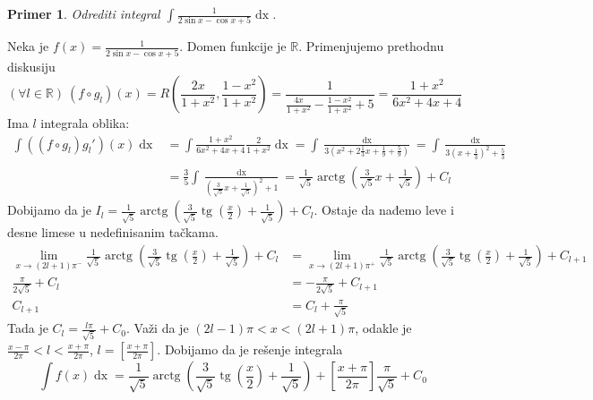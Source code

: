 \documentclass{article}
\newtheorem{prim}{Primer}[section]
\DeclareMathOperator{\tg}{tg}
\DeclareMathOperator{\arctg}{arctg}
\DeclareMathOperator{\dx}{dx}
\begin{document}
\begin{primbox}
    \label{primer_1.15}
    \begin{prim}
        Odrediti integral $\displaystyle\int\frac{1}{2\sin{x}-\cos{x}+5}\dx$.
    \end{prim}
    Neka je $\displaystyle f\left(x\right)=\frac{1}{2\sin{x}-\cos{x}+5}$. Domen funkcije je $\mathbb{R}$. Primenjujemo prethodnu diskusiju
    $$\left(\forall l\in\mathbb{R}\right)\ \left(f\circ g_l\right)\left(x\right)=R\left(\frac{2x}{1+x^2},\frac{1-x^2}{1+x^2}\right)= \frac{1}{\frac{4x}{1+x^2}-\frac{1-x^2}{1+x^2}+5}=\frac{1+x^2}{6x^2+4x+4}$$
    Ima $l$ integrala oblika:
    \begin{align*}
        \int \left(\left(f\circ g_l\right)g_l'\right)\left(x\right)\dx & =\int\frac{1+x^2}{6x^2+4x+4}\frac{2}{1+x^2}\dx=\int \frac{\dx}{3\left(x^2+2\frac{1}{3}x+\frac{1}{9}+\frac{5}{9}\right)}=\int\frac{\dx}{3\left(x+\frac{1}{3}\right)^2+\frac{5}{3}} \\
                                                                       & =\frac{3}{5}\int\frac{\dx}{\left(\frac{3}{\sqrt{5}}x+\frac{1}{\sqrt{5}}\right)^2+1}=\frac{1}{\sqrt{5}}\arctg\left(\frac{3}{\sqrt{5}}x+\frac{1}{\sqrt{5}}\right)+C_l
    \end{align*}
    Dobijamo da je $I_l =\frac{1}{\sqrt{5}}\arctg\left(\frac{3}{\sqrt{5}}\tg\left(\frac{x}{2}\right)+\frac{1}{\sqrt{5}}\right)+C_l$. Ostaje da nađemo leve i desne limese u nedefinisanim tačkama.
    \begin{align*}
        \lim\limits_{x\to \left(2l+1\right)\pi^{-}}\frac{1}{\sqrt{5}}\arctg\left(\frac{3}{\sqrt{5}}\tg\left(\frac{x}{2}\right)+\frac{1}{\sqrt{5}}\right)+C_l & =\lim\limits_{x\to \left(2l+1\right)\pi^{+}}\frac{1}{\sqrt{5}}\arctg\left(\frac{3}{\sqrt{5}}\tg\left(\frac{x}{2}\right)+\frac{1}{\sqrt{5}}\right)+C_{l+1} \\
        \frac{\pi}{2\sqrt{5}}+C_l                                                                                                                            & =-\frac{\pi}{2\sqrt{5}}+C_{l+1}                                                                                                                           \\
        C_{l+1}                                                                                                                                              & =C_l+\frac{\pi}{\sqrt{5}}
    \end{align*}
    Tada je $\displaystyle C_l=\frac{l\pi}{\sqrt{5}}+C_0$. Važi da je $\left(2l-1\right)\pi<x<\left(2l+1\right)\pi$, odakle je
    $\displaystyle\frac{x-\pi}{2\pi}<l<\frac{x+\pi}{2\pi}$, $\displaystyle l=\left[\frac{x+\pi}{2\pi}\right]$.
    Dobijamo da je rešenje integrala
    $$\int f\left(x\right)\dx=\frac{1}{\sqrt{5}}\arctg\left(\frac{3}{\sqrt{5}}\tg\left(\frac{x}{2}\right)+\frac{1}{\sqrt{5}}\right)+\left[\frac{x+\pi}{2\pi}\right]\frac{\pi}{\sqrt{5}}+C_0$$
\end{primbox}
\end{document}
